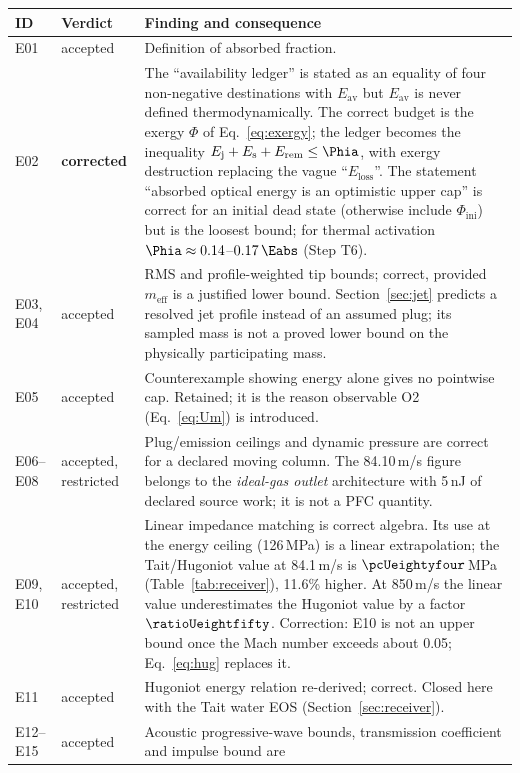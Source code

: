\begin{center}\small
\begin{longtable}{p{}p{}p{}}
\toprule ID & Verdict & Finding and consequence\\\midrule\endhead
E01 & accepted & Definition of absorbed fraction.\\
E02 & \textbf{corrected} & The ``availability ledger'' is stated as an equality of four non-negative
destinations with $E_{\mathrm{av}}$ but $E_{\mathrm{av}}$ is never defined thermodynamically. The correct
budget is the exergy $\Phi$ of Eq.~\eqref{eq:exergy}; the ledger becomes the inequality
$E_{\mathrm j}+E_{\mathrm s}+E_{\mathrm{rem}}\le\Phia$, with exergy destruction replacing the vague
``$E_{\mathrm{loss}}$''. The statement ``absorbed optical energy is an optimistic upper cap'' is correct
for an initial dead state (otherwise include $\Phi_{\mathrm{ini}}$)
but is the loosest bound; for thermal activation $\Phia\approx0.14$--$0.17\,\Eabs$ (Step T6).\\
E03, E04 & accepted & RMS and profile-weighted tip bounds; correct, provided $m_{\mathrm{eff}}$ is a
justified lower bound. Section~\ref{sec:jet} predicts a resolved jet profile instead of an assumed
plug; its sampled mass is not a proved lower bound on the physically participating mass.\\
E05 & accepted & Counterexample showing energy alone gives no pointwise cap. Retained; it is the reason
observable O2 (Eq.~\eqref{eq:Um}) is introduced.\\
E06--E08 & accepted, restricted & Plug/emission ceilings and dynamic pressure are correct for a declared
moving column. The 84.10\,m/s figure belongs to the \emph{ideal-gas outlet} architecture with
5\,nJ of declared source work; it is not a PFC quantity.\\
E09, E10 & accepted, restricted & Linear impedance matching is correct algebra. Its use at the energy
ceiling (126\,MPa) is a linear extrapolation; the Tait/Hugoniot value at 84.1\,m/s is
$\pcUeightyfour$\,MPa (Table~\ref{tab:receiver}), 11.6\% higher. At 850\,m/s the linear value
underestimates the Hugoniot value by a factor $\ratioUeightfifty$. Correction: E10 is not an upper
bound once the Mach number exceeds about 0.05; Eq.~\eqref{eq:hug} replaces it.\\
E11 & accepted & Hugoniot energy relation re-derived; correct. Closed here with the Tait water EOS
(Section~\ref{sec:receiver}).\\
E12--E15 & accepted & Acoustic progressive-wave bounds, transmission coefficient and impulse bound are

\end{longtable}
\end{center}
